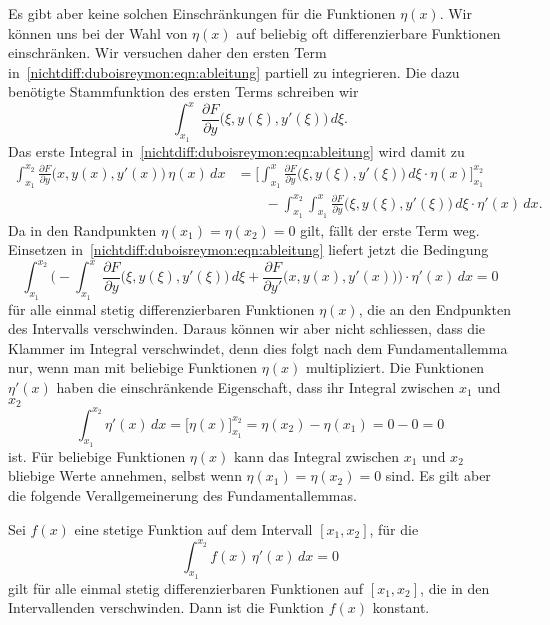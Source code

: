 Es gibt aber keine solchen Einschränkungen für die Funktionen $\eta(x)$.
Wir können uns bei der Wahl von $\eta(x)$ auf beliebig oft differenzierbare
Funktionen einschränken.
Wir versuchen daher den ersten Term
in~\eqref{nichtdiff:duboisreymon:eqn:ableitung}
partiell zu integrieren.
Die dazu benötigte Stammfunktion des ersten Terms schreiben wir
\[
\int_{x_1}^x
\frac{\partial F}{\partial y}\bigl(\xi, y(\xi), y'(\xi)\bigr)\,d\xi.
\]
Das erste Integral in~\eqref{nichtdiff:duboisreymon:eqn:ableitung}
wird damit zu
\begin{align*}
\int_{x_1}^{x_2}
\frac{\partial F}{\partial y}\bigl(x,y(x),y'(x)\bigr)\,\eta(x)\,dx
&=
\biggl[
\int_{x_1}^{x}
\frac{\partial F}{\partial y}\bigl(\xi,y(\xi),y'(\xi)\bigr)
\,d\xi
\cdot 
\eta(x)
\biggr]_{x_1}^{x_2}
\\
&\qquad
-
\int_{x_1}^{x_2}
\int_{x_1}^{x}
\frac{\partial F}{\partial y}\bigl(\xi,y(\xi),y'(\xi)\bigr)
\,d\xi
\cdot\eta'(x)
\,dx.
\end{align*}
Da in den Randpunkten $\eta(x_1)=\eta(x_2)=0$ gilt, 
fällt der erste Term weg.
Einsetzen in~\eqref{nichtdiff:duboisreymon:eqn:ableitung}
liefert jetzt die Bedingung
\begin{equation}
\int_{x_1}^{x_2}
\biggl(
-\int_{x_1}^x\frac{\partial F}{\partial y}\bigl(\xi, y(\xi),y'(\xi)\bigr)
\,d\xi
+
\frac{\partial F}{\partial y'}\bigl(x,y(x),y'(x)\bigr)
\biggr)
\cdot
\eta'(x)\,dx
=
0
\label{buch:nichtdiff:duboisreymond:eqn:integralgleichung}
\end{equation}
für alle einmal stetig differenzierbaren Funktionen $\eta(x)$, die
an den Endpunkten des Intervalls verschwinden.
Daraus können wir aber nicht schliessen, dass die Klammer im
Integral verschwindet, denn dies folgt nach dem Fundamentallemma
nur, wenn man mit beliebige Funktionen $\eta(x)$ multipliziert.
Die Funktionen $\eta'(x)$ haben die einschränkende Eigenschaft,
dass ihr Integral zwischen $x_1$ und $x_2$
\[
\int_{x_1}^{x_2}
\eta'(x)\,dx
=
\biggl[
\eta(x)
\biggr]_{x_1}^{x_2}
=
\eta(x_2) - \eta(x_1)
=
0-0
=
0
\]
ist.
Für beliebige Funktionen $\eta(x)$ kann das Integral zwischen $x_1$
und $x_2$ bliebige Werte annehmen, selbst wenn $\eta(x_1)=\eta(x_2)=0$
sind.
Es gilt aber die folgende Verallgemeinerung des Fundamentallemmas.

\begin{lemma}
\label{buch:nichtdiff:duboisreymond:lemma:duboisreymond}
Sei $f(x)$ eine stetige Funktion auf dem Intervall $[x_1,x_2]$, für die
\[
\int_{x_1}^{x_2}
f(x)\,\eta'(x)\,dx
=
0
\]
gilt für alle einmal stetig differenzierbaren Funktionen auf $[x_1,x_2]$,
die in den Intervallenden verschwinden.
Dann ist die Funktion $f(x)$ konstant.
\end{lemma}

